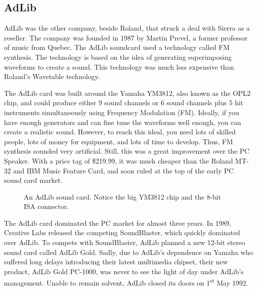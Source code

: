 \documentclass[book.tex]{subfiles}
\begin{document}
 \subsection{AdLib}
AdLib was the other company, beside Roland, that struck a deal with Sierra as a reseller. The company was founded in 1987 by Martin Prevel, a former professor of music from Quebec. The AdLib soundcard used a technology called FM synthesis. The technology is based on the idea of generating superimposing waveforms to create a sound. This technology was much less expensive than Roland's Wavetable technology.\\

\par
The AdLib card was built around the Yamaha YM3812, also known as the OPL2 chip, and could produce either 9 sound channels or 6 sound channels plus 5 hit instruments simultaneously using Frequency Modulation (FM). Ideally, if you have enough generators and can fine tune the waveforms well enough, you can create a realistic sound. However, to reach this ideal, you need lots of skilled people, lots of money for equipment, and lots of time to develop. Thus, FM synthesis sounded very artificial. Still, this was a great improvement over the PC Speaker. With a price tag of \$219.99, it was much cheaper than the Roland MT-32 and IBM Music Feature Card, and soon ruled at the top of the early PC sound card market.\\

\par
  \begin{figure}[H] 
    \centering 
    \caption{An AdLib sound card. Notice the big YM3812 chip and the 8-bit ISA connector.}
  \end{figure}

\par
The AdLib card dominated the PC market for almost three years. In 1989, Creative Labs released the competing SoundBlaster, which quickly dominated over AdLib. To compete with SoundBlaster, AdLib planned a new 12-bit stereo sound card called AdLib Gold. Sadly, due to AdLib's dependence on Yamaha who suffered long delays introducing their latest multimedia chipset, their new product, AdLib Gold PC-1000, was never to see the light of day under AdLib's management. Unable to remain solvent, AdLib closed its doors on 1\textsuperscript{st} May 1992.\\
\end{document}
